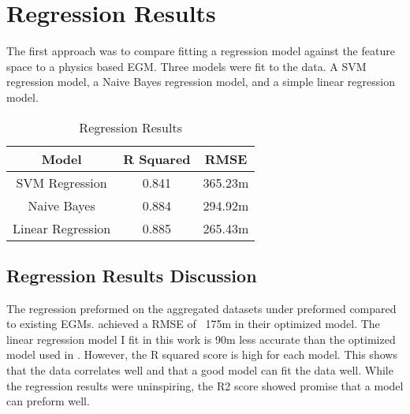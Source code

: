 \section{Regression Results}
The first approach was to compare fitting a regression model against the feature space to a physics based \ac{EGM}.
Three models were fit to the data. 
A SVM regression model, a Naive Bayes regression model, and a simple linear regression model.

\begin{center}
    \begin{table}[htb]
        \begin{tabular}{|c c c|}
            \hline
				\textbf{Model} & \textbf{R Squared} & \textbf{RMSE} \\
				\hline
				SVM Regression & 0.841 & 365.23m \\
				Naive Bayes & 0.884 & 294.92m \\
				Linear Regression & 0.885 & 265.43m \\
				\hline
        \end{tabular}
        \label{table:REGRESSION_RESULTS}
        \caption{Regression Results}
    \end{table}
\end{center}

\subsection{Regression Results Discussion}
The regression preformed on the aggregated datasets under preformed compared to existing \ac{EGM}s.
\cite{jena2012prediction} achieved a \ac{RMSE} of ~175m in their optimized model.
The linear regression model I fit in this work is 90m less accurate than the optimized model used in \cite{jena2012prediction}.
However, the R squared score is high for each model. 
This shows that the data correlates well and that a good model can fit the data well.
While the regression results were uninspiring, the R2 score showed promise that a model can preform well.



%
%



